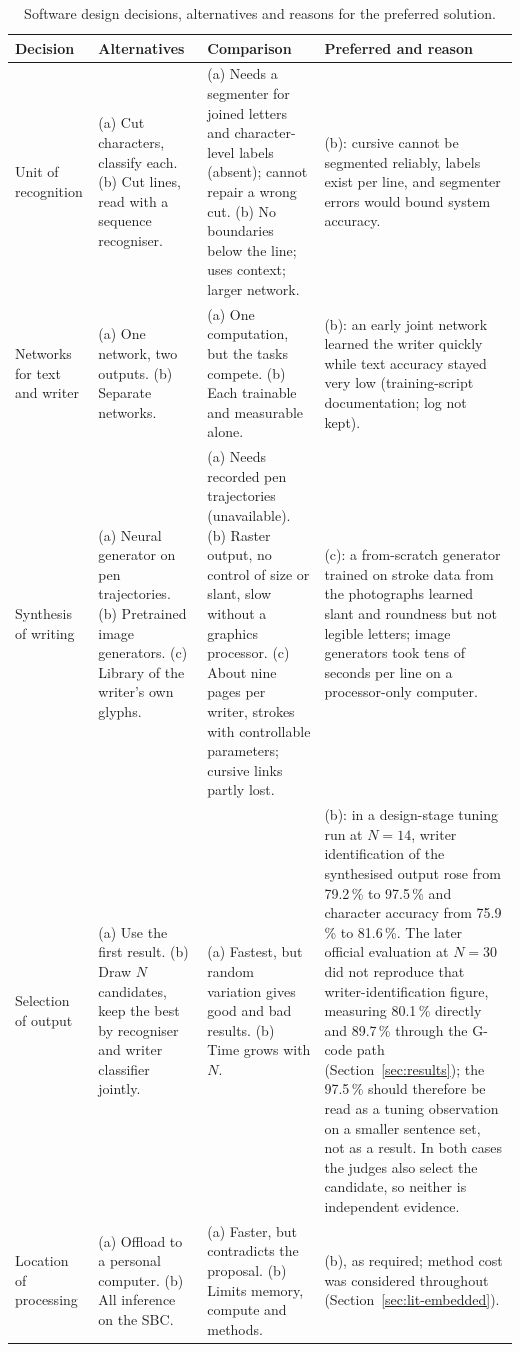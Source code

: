 \begin{table}[htbp]
\centering
\fontsize{9}{10.5}\selectfont
\begin{tabular}{|p{1.6cm}|p{3.4cm}|p{4.3cm}|p{4.3cm}|}
\hline
\textbf{Decision} & \textbf{Alternatives} & \textbf{Comparison} & \textbf{Preferred and reason} \\
\hline
Unit of recognition & (a) Cut characters, classify each. (b) Cut lines, read with a sequence recogniser. & (a) Needs a segmenter for joined letters and character-level labels (absent); cannot repair a wrong cut. (b) No boundaries below the line; uses context; larger network. & (b): cursive cannot be segmented reliably, labels exist per line, and segmenter errors would bound system accuracy. \\
\hline
Networks for text and writer & (a) One network, two outputs. (b) Separate networks. & (a) One computation, but the tasks compete. (b) Each trainable and measurable alone. & (b): an early joint network learned the writer quickly while text accuracy stayed very low (training-script documentation; log not kept). \\
\hline
Synthesis of writing & (a) Neural generator on pen trajectories. (b) Pretrained image generators. (c) Library of the writer's own glyphs. & (a) Needs recorded pen trajectories (unavailable). (b) Raster output, no control of size or slant, slow without a graphics processor. (c) About nine pages per writer, strokes with controllable parameters; cursive links partly lost. & (c): a from-scratch generator trained on stroke data from the photographs learned slant and roundness but not legible letters; image generators took tens of seconds per line on a processor-only computer. \\
\hline
Selection of output & (a) Use the first result. (b) Draw $N$ candidates, keep the best by recogniser and writer classifier jointly. & (a) Fastest, but random variation gives good and bad results. (b) Time grows with $N$. & (b): in a design-stage tuning run at $N=14$, writer identification of the synthesised output rose from 79.2\,\% to 97.5\,\% and character accuracy from 75.9\,\% to 81.6\,\%. The later official evaluation at $N=30$ did not reproduce that writer-identification figure, measuring 80.1\,\% directly and 89.7\,\% through the G-code path (Section~\ref{sec:results}); the 97.5\,\% should therefore be read as a tuning observation on a smaller sentence set, not as a result. In both cases the judges also select the candidate, so neither is independent evidence. \\
\hline
Location of processing & (a) Offload to a personal computer. (b) All inference on the SBC. & (a) Faster, but contradicts the proposal. (b) Limits memory, compute and methods. & (b), as required; method cost was considered throughout (Section~\ref{sec:lit-embedded}). \\
\hline
\end{tabular}
\caption{Software design decisions, alternatives and reasons for the preferred solution.}
\label{tab:app-software}
\end{table}

